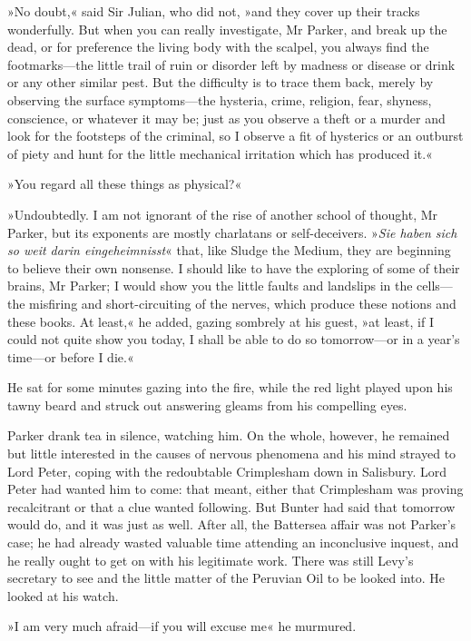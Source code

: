 »No doubt,« said Sir Julian, who did not, »and they cover up their tracks wonderfully. But when you can really investigate, Mr Parker, and break up the dead, or for preference the living body with the scalpel, you always find the footmarks—the little trail of ruin or disorder left by madness or disease or drink or any other similar pest. But the difficulty is to trace them back, merely by observing the surface symptoms—the hysteria, crime, religion, fear, shyness, conscience, or whatever it may be; just as you observe a theft or a murder and look for the footsteps of the criminal, so I observe a fit of hysterics or an outburst of piety and hunt for the little mechanical irritation which has produced it.«

»You regard all these things as physical?«

»Undoubtedly. I am not ignorant of the rise of another school of thought, Mr Parker, but its exponents are mostly charlatans or self-deceivers. »\textit{Sie haben sich so weit darin eingeheimnisst}« that, like Sludge the Medium, they are beginning to believe their own nonsense. I should like to have the exploring of some of their brains, Mr Parker; I would show you the little faults and landslips in the cells—the misfiring and short-circuiting of the nerves, which produce these notions and these books. At least,« he added, gazing sombrely at his guest, »at least, if I could not quite show you today, I shall be able to do so tomorrow—or in a year's time—or before I die.«

He sat for some minutes gazing into the fire, while the red light played upon his tawny beard and struck out answering gleams from his compelling eyes.

Parker drank tea in silence, watching him. On the whole, however, he remained but little interested in the causes of nervous phenomena and his mind strayed to Lord Peter, coping with the redoubtable Crimplesham down in Salisbury. Lord Peter had wanted him to come: that meant, either that Crimplesham was proving recalcitrant or that a clue wanted following. But Bunter had said that tomorrow would do, and it was just as well. After all, the Battersea affair was not Parker's case; he had already wasted valuable time attending an inconclusive inquest, and he really ought to get on with his legitimate work. There was still Levy's secretary to see and the little matter of the Peruvian Oil to be looked into. He looked at his watch.

»I am very much afraid—if you will excuse me\longdash« he murmured.

